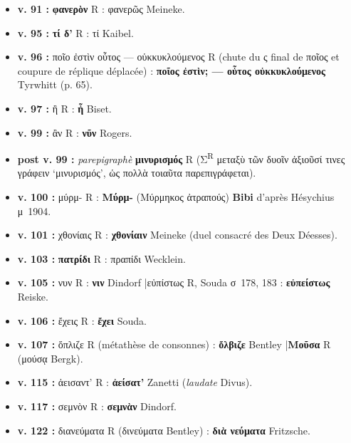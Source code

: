 \documentclass[10pt, a4paper, twoside]{book}
\renewcommand{\_}{\origunderscore\penalty0\relax}
\providecommand{\italique}[1]{\emph{#1}}
\providecommand{\lecon}[1]{\textbf{#1}}
\providecommand{\espApp}{\hspace{0.5em}|\hspace{0.5em}}
\begin{document}
\begin{itemize}
\begin{itemize}
    \item \textbf{v. 91 :} \lecon{φανερὸν} R : φανερῶς Meineke.
    \item \textbf{v. 95 :} \lecon{τί δ'} R : τί Kaibel.
    \item \textbf{v. 96 :} ποῖο ἐστὶν οὗτος — οὑκκυκλούμενος R (chute du ς final de ποῖος et coupure de réplique déplacée) : \lecon{ποῖος ἐστὶν; — οὗτος οὑκκυκλούμενος} Tyrwhitt (p. 65).
    \item \textbf{v. 97 :} ἢ R : \lecon{ἦ} Biset.
    \item \textbf{v. 99 :} ἂν R : \lecon{νῦν} Rogers.
    \item \textbf{post v. 99 :} \italique{parepigraphè} \lecon{μινυρισμός} R (Σ\textsuperscript{R} μεταξὺ τῶν δυοῖν ἀξιοῦσί τινες γράφειν `μινυρισμός', ὡς πολλὰ τοιαῦτα παρεπιγράφεται).
    \item \textbf{v. 100 :} μύρμ- R : \lecon{Μύρμ-} (Μύρμηκος ἀτραπούς) \lecon{Bibi} d'après Hésychius μ~1904.
    \item \textbf{v. 101 :} χθονίαις R : \lecon{χθονίαιν} Meineke (duel consacré des Deux Déesses).
    \item \textbf{v. 103 :} \lecon{πατρίδι} R : πραπίδι Wecklein.
    \item \textbf{v. 105 :} νυν R : \lecon{νιν} Dindorf \espApp εὐπίστως R, Souda σ~178, 183 : \lecon{εὐπείστως} Reiske.
    \item \textbf{v. 106 :} ἔχεις R : \lecon{ἔχει} Souda.
    \item \textbf{v. 107 :} ὅπλιζε R (métathèse de consonnes) : \lecon{ὄλβιζε} Bentley \espApp \lecon{Μοῦσα} R (μούσᾳ Bergk).
    \item \textbf{v. 115 :} ἀεισαντ' R : \lecon{ἀείσατ'} Zanetti (\italique{laudate} Divus).
    \item \textbf{v. 117 :} σεμνὸν R : \lecon{σεμνὰν} Dindorf.
    \item \textbf{v. 122 :} διανεύματα R (δινεύματα Bentley) : \lecon{διὰ νεύματα} Fritzsche.
  \end{itemize}
\end{itemize}
\end{document}

